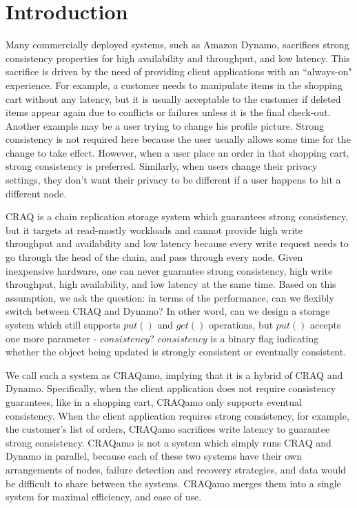 \section{Introduction}
\label{sec:intro}

Many commercially deployed systems, such as Amazon Dynamo\cite{decandia2007dynamo}, sacrifices strong consistency properties for high availability and throughput, and low latency. This sacrifice is driven by the need of providing client applications with an ``always-on" experience. For example, a customer needs to manipulate items in the shopping cart without any latency, but it is usually acceptable to the customer if deleted items appear again due to conflicts or failures unless it is the final check-out. Another example may be a user trying to change his profile picture. Strong consistency is not required here because the user usually allows some time for the change to take effect. However, when a user place an order in that shopping cart, strong consistency is preferred. Similarly, when users change their privacy settings, they don't want their privacy to be different if a user happens to hit a different node.

CRAQ\cite{terrace2009object} is a chain replication storage system which guarantees strong consistency, but it targets at read-mostly workloads and cannot provide high write throughput and availability and low latency because every write request needs to go through the head of the chain, and pass through every node.  Given inexpensive hardware, one can never guarantee strong consistency, high write throughput, high availability, and low latency at the same time. Based on this assumption, we ask the question: in terms of the performance, can we flexibly switch between CRAQ and Dynamo? In other word, can we design a storage system which still supports $put()$ and $get()$ operations, but $put()$ accepts one more parameter - $consistency$? $consistency$ is a binary flag indicating whether the object being updated is strongly consistent or eventually consistent. 

We call such a system as CRAQamo, implying that it is a hybrid of CRAQ and Dynamo. Specifically, when the client application does not require consistency guarantees, like in a shopping cart, CRAQamo only supports eventual consistency. When the client application requires strong consistency, for example, the customer's list of orders, CRAQamo sacrifices write latency to guarantee strong consistency. CRAQamo is not a system which simply runs CRAQ and Dynamo in parallel, because each of these two systems have their own arrangements of nodes, failure detection and recovery strategies, and data would be difficult to share between the systems. CRAQamo merges them into a single system for maximal efficiency, and ease of use.

